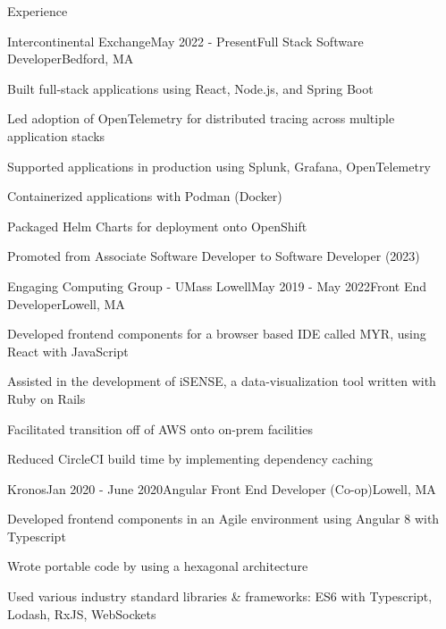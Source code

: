 \documentclass[
	10pt, %
]{resume} %
\begin{document}
\begin{rSection}{Experience}

    \begin{rSubsection}{Intercontinental Exchange}{May 2022 - Present}{Full Stack Software Developer}{Bedford, MA}
        \item Built full-stack applications using React, Node.js, and Spring Boot
        \item Led adoption of OpenTelemetry for distributed tracing across multiple application stacks
        \item Supported applications in production using Splunk, Grafana, OpenTelemetry
        \item Containerized applications with Podman (Docker)
				\item Packaged Helm Charts for deployment onto OpenShift
        \item Promoted from Associate Software Developer to Software Developer (2023)
    \end{rSubsection}
    
    \begin{rSubsection}{Engaging Computing Group - UMass Lowell}{May 2019 - May 2022}{Front End Developer}{Lowell, MA}
        \item Developed frontend components for a browser based IDE called MYR, using React with JavaScript
        \item Assisted in the development of iSENSE, a data-visualization tool written with Ruby on Rails
        \item Facilitated transition off of AWS onto on-prem facilities
        \item Reduced CircleCI build time by implementing dependency caching
    \end{rSubsection}


    \begin{rSubsection}{Kronos}{Jan 2020 - June 2020}{Angular Front End Developer (Co-op)}{Lowell, MA}
        \item Developed frontend components in an Agile environment using Angular 8 with Typescript
        \item Wrote portable code by using a hexagonal architecture
        \item Used various industry standard libraries \& frameworks: ES6 with Typescript, Lodash, RxJS, WebSockets
    \end{rSubsection}
    

\end{rSection}
\end{document}
